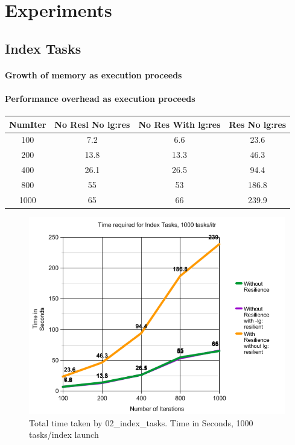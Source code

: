 
\section{Experiments}

\subsection{Index Tasks}

\paragraph{Growth of memory as execution proceeds}
\paragraph{Performance overhead as execution proceeds}



\begin{center}
 \begin{tabular}{||c | c | c | c||} 
 \hline
 NumIter& No Resl No lg:res & No Res With lg:res & Res No lg:res \\ [0.25ex] 
 \hline\hline
100 &  7.2 & 6.6 & 23.6\\ 
 \hline
200 &  13.8 & 13.3 & 46.3\\ 
 \hline
400 &  26.1 & 26.5 & 94.4\\ 
 \hline
800 &  55 & 53 & 186.8\\ 
 \hline
1000 &  65 & 66 & 239.9\\ [1ex] 
 \hline
\end{tabular}
\end{center}

\begin{figure}
\includegraphics[width=\textwidth]{images/index_tasks_time.png}
\caption{Total time taken by 02\_index\_tasks. Time in Seconds, 1000 tasks/index launch }
\end{figure}


